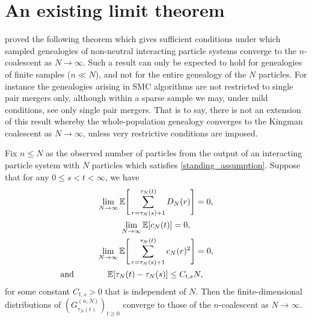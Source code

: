\section{An existing limit theorem}
\label{sec:existing}
\textcite{koskela2018} proved the following theorem which gives sufficient conditions under which sampled genealogies of non-neutral interacting particle systems converge to the $n$-coalescent as $N\to\infty$.
Such a result can only be expected to hold for genealogies of finite samples ($n\ll N$), and not for the entire genealogy of the $N$ particles. 
For instance the genealogies arising in SMC algorithms are not restricted to single pair mergers only, although within a sparse sample we may, under mild conditions, see only single pair mergers. 
That is to say, there is not an extension of this result whereby the whole-population genealogy converges to the Kingman coalescent as $N\to\infty$, unless very restrictive conditions are imposed.

\begin{theorem}\label{thm:kjjs_mainthm}
Fix $n \leq N$ as the observed number of particles from the output of an interacting particle system with $N$ particles which satisfies \ref{standing_assumption}.
Suppose that for any $0 \leq s < t < \infty$, we have
\begin{gather}\label{eq:kjjs_big_merger_bound}
\lim_{ N \rightarrow \infty } \E\Bigg[ \sum_{ r = \tau_N( s ) + 1 }^{ \tau_N( t ) } D_N( r ) \Bigg] = 0, \\
\label{eq:kjjs_binary_bound}
\lim_{ N \rightarrow \infty } \E[ c_N( t ) ] = 0, \\
\label{eq:kjjs_binary_bound_2}
\lim_{ N \rightarrow \infty } \E\Bigg[ \sum_{ r = \tau_N( s ) + 1 }^{ \tau_N( t ) } c_N( r )^2 \Bigg] = 0, \\
\label{eq:kjjs_tau_bound}
\text{and}\qquad\qquad\E[ \tau_N( t ) - \tau_N( s ) ] \leq C_{ t, s } N,\qquad\qquad\phantom{\text{and}}
\end{gather}
for some constant $C_{ t, s } > 0$ that is independent of $N$.
Then the finite-dimensional distributions of $( G_{ \tau_N( t ) }^{ ( n, N ) } )_{ t \geq 0 }$ converge to those of the $n$-coalescent as $N \rightarrow \infty$. 
\end{theorem}

